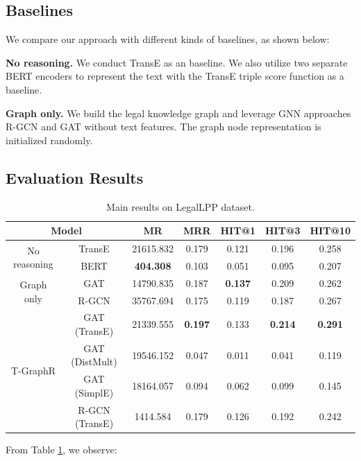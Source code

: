\documentclass[runningheads]{llncs}
\begin{document}
\subsection{Baselines}
We compare our approach with different kinds of baselines, as shown below:

\textbf{No reasoning.} We conduct TransE \cite{TransE:conf/nips/BordesUGWY13} as an   baseline. We also utilize two separate  BERT encoders to represent the text with the TransE triple score function as a baseline. 

\textbf{Graph only.} We build the legal knowledge graph and leverage GNN approaches R-GCN and GAT without text features. The graph node representation is initialized randomly. 

\subsection{Evaluation Results\label{exp}}

\begin{table}[!htbp]
\centering
\caption{Main results on LegalLPP dataset.}
\begin{tabular}{cc|ccccc}
\toprule
 \multicolumn{2}{c|}{\textbf{Model}}&  \textbf{MR} & \textbf{MRR} & \textbf{HIT@1} & \textbf{HIT@3} & \textbf{HIT@10} \\
 \midrule
\multirow{2}{*}{No reasoning}
 & TransE & 21615.832 & 0.179 & 0.121 & 0.196 & 0.258  \\
  & BERT & \textbf{404.308} & 0.103 & 0.051 & 0.095 & 0.207 \\
\midrule
\multirow{2}{*}{Graph only} & GAT & 14790.835 & 0.187 & \textbf{0.137} & 0.209 & 0.262 \\
& R-GCN & 35767.694 & 0.175 & 0.119 & 0.187 & 0.267 \\
\midrule
\multirow{4}{*}{T-GraphR}
& GAT (TransE) & 21339.555 & \textbf{0.197} & 0.133 & \textbf{0.214} & \textbf{0.291} \\

 & GAT  (DistMult)  & 19546.152 & 0.047 & 0.011 & 0.041 & 0.119 \\
  & GAT (SimplE) & 18164.057 & 0.094 & 0.062 & 0.099 & 0.145 \\
  & R-GCN  (TransE) & 1414.584 & 0.179 & 0.126 & 0.192 & 0.242 \\
\bottomrule
\end{tabular}

\label{main}
\end{table}

From Table \ref{main}, we observe: 
\end{document}
